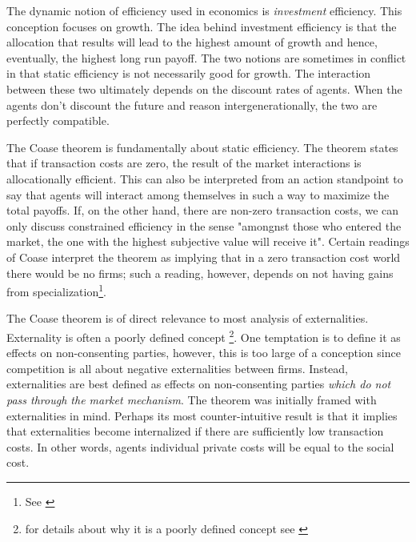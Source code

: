 The dynamic notion of efficiency used in economics is \textit{investment} efficiency. This conception focuses on growth. The idea behind investment efficiency is that the allocation that results will lead to the highest amount of growth and hence, eventually, the highest long run payoff. The two notions are sometimes in conflict in that static efficiency is not necessarily good for growth. The interaction between these two ultimately depends on the discount rates of agents. When the agents don't discount the future and reason intergenerationally, the two are perfectly compatible.

The Coase theorem is fundamentally about static efficiency. The theorem states that if transaction costs are zero, the result of the market interactions is allocationally efficient. This can also be interpreted from an action standpoint to say that agents will interact among themselves in such a way to maximize the total payoffs. If, on the other hand, there are non-zero transaction costs, we can only discuss constrained efficiency in the sense "amongnst those who entered the market, the one with the highest subjective value will receive it". Certain readings of Coase interpret the theorem  as implying that in a zero transaction cost world there would be no firms; such a reading, however, depends on not having gains from specialization\footnote{See \cite{demsetz2011rh}}.

The Coase theorem is of direct relevance to most analysis of externalities. Externality is often a poorly defined concept \footnote{for details about why it is a poorly defined concept see \cite{Cheung1970}}. One temptation is to define it as effects on non-consenting parties, however, this is too large of a conception since competition is all about negative externalities between firms. Instead, externalities are best defined as effects on non-consenting parties \textit{which do not pass through the market mechanism}. The theorem was initially framed with externalities in mind. Perhaps its most counter-intuitive result is that it implies that externalities become internalized if there are sufficiently low transaction costs. In other words, agents individual private costs will be equal to the social cost.

